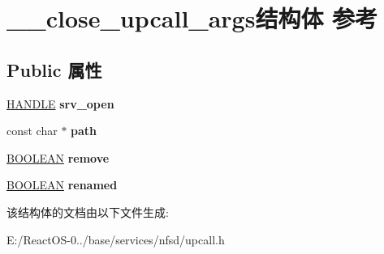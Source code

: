 \hypertarget{struct____close__upcall__args}{}\section{\+\_\+\+\_\+close\+\_\+upcall\+\_\+args结构体 参考}
\label{struct____close__upcall__args}
\subsection*{Public 属性}
\begin{DoxyCompactItemize}
\item 
\mbox{\label{struct____close__upcall__args_ac94bdc7c1ba25d00ca098b8a47dcbbc7}} 
\hyperlink{interfacevoid}{H\+A\+N\+D\+LE} {\bfseries srv\+\_\+open}
\item 
\mbox{\label{struct____close__upcall__args_a337592b443b3a5f987b6eca08ff05155}} 
const char $\ast$ {\bfseries path}
\item 
\mbox{\label{struct____close__upcall__args_a64b0a4acf0e9d13a2ad7661afa925274}} 
\hyperlink{_processor_bind_8h_a112e3146cb38b6ee95e64d85842e380a}{B\+O\+O\+L\+E\+AN} {\bfseries remove}
\item 
\mbox{\label{struct____close__upcall__args_a3c7785367a87bd7ad234e9e609a907a2}} 
\hyperlink{_processor_bind_8h_a112e3146cb38b6ee95e64d85842e380a}{B\+O\+O\+L\+E\+AN} {\bfseries renamed}
\end{DoxyCompactItemize}


该结构体的文档由以下文件生成\+:\begin{DoxyCompactItemize}
\item 
E\+:/\+React\+O\+S-\/0../base/services/nfsd/upcall.\+h\end{DoxyCompactItemize}
